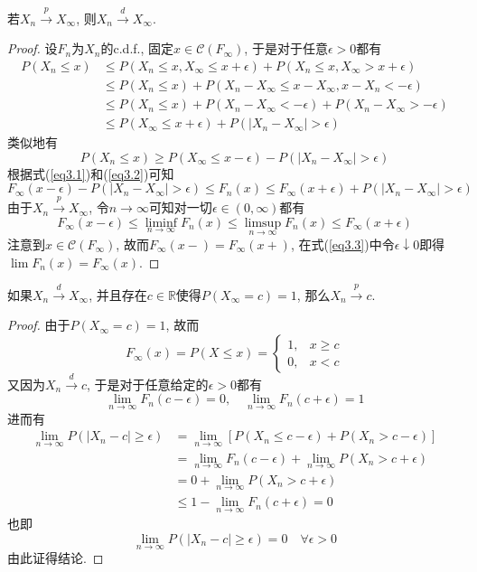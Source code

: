 \documentclass[cn, 12pt, math=mtpro2, bibstyle=apa, blue, twocol]{elegantbook}
\newcommand{\R}{\mathbb{R}}
\newcommand{\limn}{\lim_{n\to\infty}}
\begin{document}
\begin{theorem}\label{thm:thm3.1}
若$X_n\xrightarrow{p}X_\infty$, 则$X_n\xrightarrow{d}X_\infty$.
\end{theorem}
\begin{proof}
  设$F_n$为$X_n$的c.d.f., 固定$x\in\mathcal{C}(F_\infty)$, 于是对于任意$\epsilon>0$都有
  \begin{align}
  P(X_n\leq x)&\leq P(X_n\leq x, X_\infty\leq x+\epsilon)+P(X_n\leq x, X_\infty>x+\epsilon)\nonumber \\
  &\leq P(X_n\leq x)+P(X_n-X_\infty\leq x-X_\infty, x-X_n<-\epsilon) \nonumber \\
  &\leq P(X_n\leq x)+P(X_n-X_\infty<-\epsilon)+P(X_n-X_\infty>-\epsilon) \nonumber \\
  &\leq P(X_\infty\leq x+\epsilon)+P(|X_n-X_\infty|>\epsilon) \label{eq3.1}
  \end{align}
  类似地有
  \begin{equation}\label{eq3.2}
    P(X_n\leq x)\geq P(X_\infty\leq x-\epsilon)-P(|X_n-X_\infty|>\epsilon)
  \end{equation}
  根据式(\ref{eq3.1})和(\ref{eq3.2})可知
  $$F_\infty(x-\epsilon)-P(|X_n-X_\infty|>\epsilon)\leq F_n(x)\leq F_\infty(x+\epsilon)+P(|X_n-X_\infty|>\epsilon)$$
  由于$X_n\xrightarrow{p}X_\infty$, 令$n\to\infty$可知对一切$\epsilon\in(0,\infty)$都有
  \begin{equation}\label{eq3.3}
    F_\infty(x-\epsilon)\leq\liminf_{n\to\infty}F_n(x)\leq\limsup_{n\to\infty}F_n(x)\leq F_\infty(x+\epsilon)
  \end{equation}
  注意到$x\in\mathcal{C}(F_\infty)$, 故而$F_\infty(x-)=F_\infty(x+)$, 在式(\ref{eq3.3})中令$\epsilon\downarrow 0$即得$\lim F_n(x)=F_\infty(x)$.
\end{proof}

\begin{theorem}\label{thm:thm3.6}
  如果$X_n\xrightarrow{d}X_\infty$, 并且存在$c\in\R$使得$P(X_\infty=c)=1$, 那么$X_n\xrightarrow{p}c$.
\end{theorem}
\begin{proof}
  由于$P(X_\infty=c)=1$, 故而
  $$F_\infty(x)=P(X\leq x)=\begin{cases}
                        1, &x\ge c \\
                        0, & x<c
                      \end{cases}$$
  又因为$X_n\xrightarrow{d}c$, 于是对于任意给定的$\epsilon>0$都有
  $$\limn F_n(c-\epsilon)=0,\quad\limn F_n(c+\epsilon)=1$$
  进而有
  \begin{align*}
  \limn P(|X_n-c|\geq\epsilon)&=\limn \left[P(X_n\leq c-\epsilon)+P(X_n>c-\epsilon)\right] \\
  &=\limn F_n(c-\epsilon)+\limn P(X_n>c+\epsilon) \\
  &=0+\limn P(X_n>c+\epsilon) \\
  &\leq 1-\limn F_n(c+\epsilon)=0
  \end{align*}
  也即
  $$\limn P(|X_n-c|\geq\epsilon)=0\quad\forall\epsilon>0$$
  由此证得结论.
\end{proof}
\end{document}
